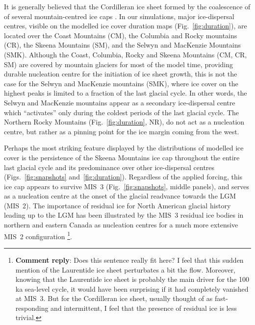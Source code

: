 \documentclass[tc, manuscript]{copernicus}
\newcommand{\renote}[1]{\footnote{\textbf{Comment reply}: #1}}
\begin{document}
It is generally believed that the Cordilleran ice sheet formed by the
coalescence of of several mountain-centred ice caps \citep{Davis.Mathews.1944}.
In our simulations, major ice-dispersal centres, visible on the modelled ice
cover duration maps (Fig.~\ref{fig:duration}), are located over the Coast
Mountains (CM), the Columbia and Rocky mountains (CR), the Skeena Mountains
(SM), and the Selwyn and MacKenzie Mountains (SMK). Although the Coast,
Columbia, Rocky and Skeena Mountains (CM, CR, SM) are covered by mountain
glaciers for most of the model time, providing durable nucleation centre for
the initiation of ice sheet growth, this is not the case for the Selwyn and
MacKenzie mountains (SMK), where ice cover on the highest peaks is limited to a
fraction of the last glacial cycle. In other words, the Selwyn and MacKenzie
mountains appear as a secondary ice-dispersal centre which ``activates'' only
during the coldest periods of the last glacial cycle. The Northern Rocky
Mountains (Fig.~\ref{fig:duration}, NR), do not act as a nucleation centre,
but rather as a pinning point for the ice margin coming from the west.

Perhaps the most striking feature displayed by the distributions of modelled
ice cover is the persistence of the Skeena Mountains ice cap throughout the
entire last glacial cycle and its predominance over other ice-dispersal centres
(Figs.~\ref{fig:snapshots} and~\ref{fig:duration}). Regardless of the applied
forcing, this ice cap appears to survive MIS~3 (Fig.~\ref{fig:snapshots},
middle panels), and serves as a nucleation centre at the onset of the glacial
readvance towards the LGM (MIS~2). The importance of residual ice for North
American glacial history leading up to the LGM has been illustrated by the
MIS~3 residual ice bodies in northern and eastern Canada as nucleation centres
for a much more extensive MIS~2 configuration \citep{Kleman.etal.2010}\renote{
    Does this sentence really fit here? I feel that this sudden mention of the
    Laurentide ice sheet perturbates a bit the flow. Moreover, knowing that
    the Laurentide ice sheet is probably the main driver for the 100\,ka
    sea-level cycle, it would have been surprising if it had completely
    vanished at MIS~3. But for the Cordilleran ice sheet, usually thought of
    as fast-responding and intermittent, I feel that the presence of residual
    ice is less trivial.}.
\end{document}
